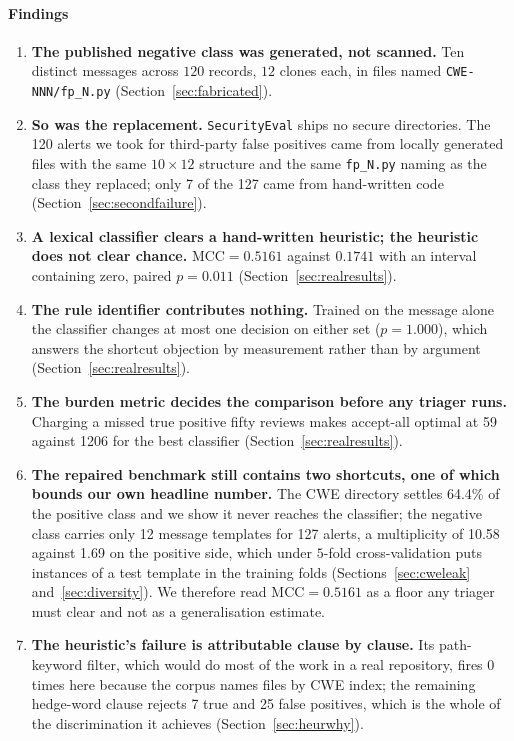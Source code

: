 \documentclass[journal]{IEEEtran}
\theoremstyle{definition}
\newcommand{\RNfp}{127}
\newcommand{\RAllBalBur}{59}
\newcommand{\RHeurBalMcc}{0.1741}
\newcommand{\RTfidfBalMcc}{0.5161}
\newcommand{\RTfidfBalBur}{1206}
\newcommand{\RMsgSame}{1.000}
\newcommand{\RHeurVsTfidf}{0.011}
\newcommand{\CMsgFp}{12}
\newcommand{\CMultTp}{1.69}
\newcommand{\CMultFp}{10.58}
\newcommand{\CPathClauseTp}{0}
\newcommand{\CHedgeTp}{7}
\newcommand{\CHedgeFp}{25}
\newcommand{\CFpSecure}{120}
\newcommand{\CFpPatched}{7}
\newcommand{\DTpOnOnlyPct}{64.4}
\begin{document}
\paragraph{Findings}
\begin{enumerate}
\item \textbf{The published negative class was generated, not scanned.} Ten
distinct messages across $120$ records, $12$ clones each, in files named
\texttt{CWE-\allowbreak{}NNN/\allowbreak{}fp\_\allowbreak{}N.\allowbreak{}py} (Section~\ref{sec:fabricated}).
\item \textbf{So was the replacement.} \texttt{SecurityEval} ships no secure
directories. The \CFpSecure{} alerts we took for third-party false positives came
from locally generated files with the same $10 \times 12$ structure and the same
\texttt{fp\_N.py} naming as the class they replaced; only \CFpPatched{} of the
\RNfp{} came from hand-written code (Section~\ref{sec:secondfailure}).
\item \textbf{A lexical classifier clears a hand-written heuristic; the
heuristic does not clear chance.} $\mathrm{MCC} = \RTfidfBalMcc$ against
$\RHeurBalMcc$ with an interval containing zero, paired
$p = \RHeurVsTfidf$ (Section~\ref{sec:realresults}).
\item \textbf{The rule identifier contributes nothing.} Trained on the message
alone the classifier changes at most one decision on either set
($p = \RMsgSame$), which answers the shortcut objection by measurement rather
than by argument (Section~\ref{sec:realresults}).
\item \textbf{The burden metric decides the comparison before any triager
runs.} Charging a missed true positive fifty reviews makes accept-all optimal
at \RAllBalBur{} against \RTfidfBalBur{} for the best classifier
(Section~\ref{sec:realresults}).
\item \textbf{The repaired benchmark still contains two shortcuts, one of
which bounds our own headline number.} The CWE directory settles
\DTpOnOnlyPct\% of the positive class and we show it never reaches the
classifier; the negative class carries only \CMsgFp{} message templates for
\RNfp{} alerts, a multiplicity of \CMultFp{} against \CMultTp{} on the positive
side, which under \(5\)-fold cross-validation puts instances of a test
template in the training folds (Sections~\ref{sec:cweleak}
and~\ref{sec:diversity}). We therefore read
$\mathrm{MCC} = \RTfidfBalMcc$ as a floor any triager must clear and not as a
generalisation estimate.
\item \textbf{The heuristic's failure is attributable clause by clause.} Its
path-keyword filter, which would do most of the work in a real repository,
fires \CPathClauseTp{} times here because the corpus names files by CWE index;
the remaining hedge-word clause rejects \CHedgeTp{} true and \CHedgeFp{} false
positives, which is the whole of the discrimination it achieves
(Section~\ref{sec:heurwhy}).
\end{enumerate}
\end{document}
